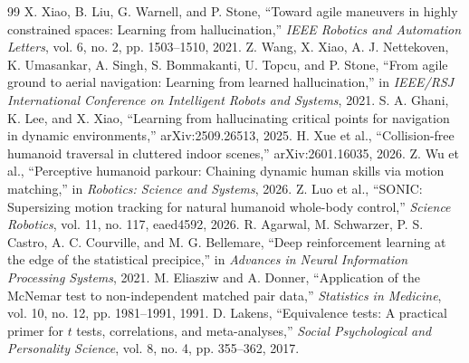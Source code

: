 \documentclass[letterpaper,10pt,conference]{ieeeconf}
\begin{document}
\begin{thebibliography}{99}
 X. Xiao, B. Liu, G. Warnell, and P. Stone,
``Toward agile maneuvers in highly constrained spaces: Learning from hallucination,''
\emph{IEEE Robotics and Automation Letters}, vol. 6, no. 2, pp. 1503--1510, 2021.
 Z. Wang, X. Xiao, A. J. Nettekoven, K. Umasankar, A. Singh,
S. Bommakanti, U. Topcu, and P. Stone,
``From agile ground to aerial navigation: Learning from learned hallucination,''
in \emph{IEEE/RSJ International Conference on Intelligent Robots and Systems}, 2021.
 S. A. Ghani, K. Lee, and X. Xiao,
``Learning from hallucinating critical points for navigation in dynamic environments,''
arXiv:2509.26513, 2025.
 H. Xue et al.,
``Collision-free humanoid traversal in cluttered indoor scenes,''
arXiv:2601.16035, 2026.
 Z. Wu et al., ``Perceptive humanoid parkour: Chaining dynamic human
skills via motion matching,'' in \emph{Robotics: Science and Systems}, 2026.
 Z. Luo et al., ``SONIC: Supersizing motion tracking for natural
humanoid whole-body control,'' \emph{Science Robotics}, vol. 11, no. 117,
eaed4592, 2026.
 R. Agarwal, M. Schwarzer, P. S. Castro, A. C. Courville, and
M. G. Bellemare, ``Deep reinforcement learning at the edge of the statistical
precipice,'' in \emph{Advances in Neural Information Processing Systems}, 2021.
 M. Eliasziw and A. Donner, ``Application of the McNemar test to
non-independent matched pair data,'' \emph{Statistics in Medicine}, vol. 10,
no. 12, pp. 1981--1991, 1991.
 D. Lakens, ``Equivalence tests: A practical primer for $t$ tests,
correlations, and meta-analyses,'' \emph{Social Psychological and Personality
Science}, vol. 8, no. 4, pp. 355--362, 2017.
\end{thebibliography}
\end{document}
